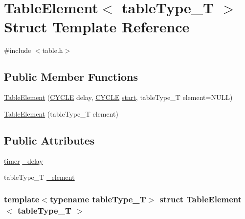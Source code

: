 \hypertarget{structTableElement}{
\section{TableElement$<$ tableType\_\-T $>$ Struct Template Reference}
\label{structTableElement}
}


{\ttfamily \#include $<$table.h$>$}

\subsection*{Public Member Functions}
\begin{DoxyCompactItemize}
\item 
\hyperlink{structTableElement_a4ea30cdbfb27a82488fd8fb422777f74}{TableElement} (\hyperlink{global_2global_8h_a7e19a550ec11d1ed921deb20c22efb5b}{CYCLE} delay, \hyperlink{global_2global_8h_a7e19a550ec11d1ed921deb20c22efb5b}{CYCLE} \hyperlink{bkEnd_8cpp_ada310e7f72b38fadd4b24d80ed3438ee}{start}, tableType\_\-T element=NULL)
\item 
\hyperlink{structTableElement_aee053def7c4abbfacd0349d5e6f213e0}{TableElement} (tableType\_\-T element)
\end{DoxyCompactItemize}
\subsection*{Public Attributes}
\begin{DoxyCompactItemize}
\item 
\hyperlink{structtimer}{timer} \hyperlink{structTableElement_a360409caa18be13ff49eb33b9761ef51}{\_\-delay}
\item 
tableType\_\-T \hyperlink{structTableElement_a00a6de9a65467916319e8fd276f8f3f9}{\_\-element}
\end{DoxyCompactItemize}
\subsubsection*{template$<$typename tableType\_\-T$>$ struct TableElement$<$ tableType\_\-T $>$}



